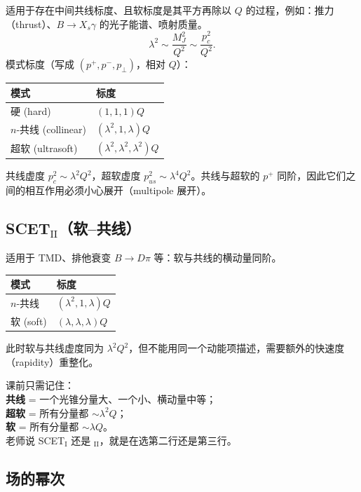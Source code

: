 \documentclass[11pt,a4paper]{article}
\theoremstyle{definition}
\theoremstyle{plain}
\theoremstyle{remark}
\begin{document}
适用于存在中间共线标度、且软标度是其平方再除以 $Q$ 的过程，例如：推力（thrust）、$B\to X_s\gamma$ 的光子能谱、喷射质量。
\begin{equation}
  \lambda^2\sim \frac{M_J^2}{Q^2}\sim \frac{p_c^2}{Q^2}.
\end{equation}
模式标度（写成 $(p^+,p^-,p_\perp)$，相对 $Q$）：
\begin{center}
\begin{tabular}{ll}
\toprule
模式 & 标度 \\
\midrule
硬 (hard) & $(1,1,1)Q$ \\
$n$-共线 (collinear) & $(\lambda^2,1,\lambda)Q$ \\
超软 (ultrasoft) & $(\lambda^2,\lambda^2,\lambda^2)Q$ \\
\bottomrule
\end{tabular}
\end{center}
共线虚度 $p_c^2\sim \lambda^2 Q^2$，超软虚度 $p_{us}^2\sim \lambda^4 Q^2$。共线与超软的 $p^+$ 同阶，因此它们之间的相互作用必须小心展开（multipole 展开）。

\subsection{SCET$_{\mathrm{II}}$（软--共线）}

适用于 TMD、排他衰变 $B\to D\pi$ 等：软与共线的横动量同阶。
\begin{center}
\begin{tabular}{ll}
\toprule
模式 & 标度 \\
\midrule
$n$-共线 & $(\lambda^2,1,\lambda)Q$ \\
软 (soft) & $(\lambda,\lambda,\lambda)Q$ \\
\bottomrule
\end{tabular}
\end{center}
此时软与共线虚度同为 $\lambda^2 Q^2$，但不能用同一个动能项描述，需要额外的快速度（rapidity）重整化。

\begin{keybox}
课前只需记住：\\
\textbf{共线} = 一个光锥分量大、一个小、横动量中等；\\
\textbf{超软} = 所有分量都 $\sim\lambda^2 Q$；\\
\textbf{软} = 所有分量都 $\sim\lambda Q$。\\
老师说 SCET$_{\mathrm I}$ 还是 ${}_{\mathrm{II}}$，就是在选第二行还是第三行。
\end{keybox}

\subsection{场的幂次}
\end{document}
